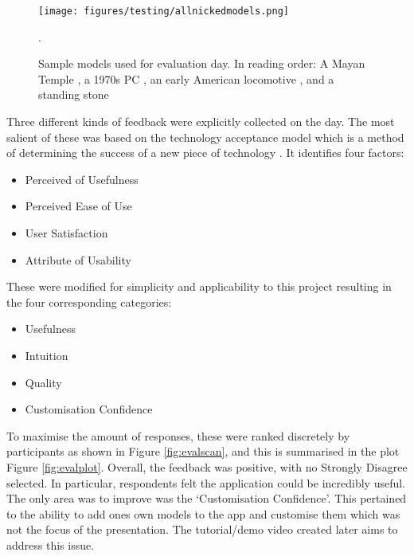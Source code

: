 \documentclass{article}
\begin{document}
\begin{figure}
    \texttt{[image: figures/testing/allnickedmodels.png]}
        \caption{Sample models used for evaluation day. In reading order: A Mayan Temple \cite{testing:mayantemple}, a 1970s PC \cite{testing:computer}, an early American locomotive \cite{testing:locomotive}, and a standing stone \cite{testing:standingstone}}.
        \label{fig:evalmodels}
\end{figure}

Three different kinds of feedback were explicitly collected on the day. The most salient of these was based on the technology acceptance model which is a method of determining the success of a new piece of technology \cite{testing:acceptancemodel}. It identifies four factors:
\begin{itemize}
    \item Perceived of Usefulness
    \item Perceived Ease of Use
    \item User Satisfaction
    \item Attribute of Usability
\end{itemize}
These were modified for simplicity and applicability to this project resulting in the four corresponding categories:
\begin{itemize}
    \item Usefulness
    \item Intuition
    \item Quality
    \item Customisation Confidence
\end{itemize}
To maximise the amount of responses, these were ranked discretely by participants as shown in Figure \ref{fig:evalscan}, and this is summarised in the plot Figure \ref{fig:evalplot}. Overall, the feedback was positive, with no Strongly Disagree selected. In particular, respondents felt the application could be incredibly useful. The only area was to improve was the `Customisation Confidence'. This pertained to the ability to add ones own models to the app and customise them which was not the focus of the presentation. The tutorial/demo video created later aims to address this issue.
\end{document}
